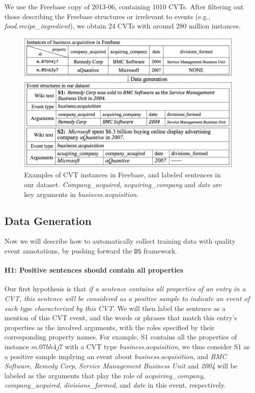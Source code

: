 We use the Freebase copy of 2013-06,  %
containing 1010 CVTs. After filtering out those %
describing the Freebase structures  or irrelevant to events (e.g., \emph{food.recipe\_ingredient}), we obtain 24 CVTs with around 280 million instances.    
%
\begin{figure}[h]
	\centering
	\includegraphics[width=.45\textwidth]{temp}
	\caption{Examples of CVT instances in Freebase, and labeled sentences in our dataset. \emph{Company\_acquired}, \emph{acquiring\_company} and \emph{date} are key arguments in \emph{business.acquisition}. \label{fig:3}}
\end{figure}

\subsection{Data Generation\label{datagen}}
Now we will describe how to automatically collect training data with quality event annotations, by pushing forward the \texttt{DS} framework.

\paragraph{H1: Positive sentences should contain all properties}
Our first hypothesis is that \textit{if a sentence contains all properties of an entry in a CVT, this sentence will be 
considered as a positive sample to indicate an event of such type characterized by this CVT}. 
We will then label the sentence as a mention of this CVT event, and the words or phrases that 
match this entry's properties as the involved arguments, with the roles specified by their 
corresponding property names. 
For example, S1 contains all the properties of instance $m.07bh4j7$ with a CVT type \emph{business.acquisition}, 
we thus consider S1 as a positive sample implying an event about \emph{business.acquisition}, and \emph{BMC Software}, \emph{Remedy Corp}, \emph{Service Management Business Unit} and \emph{2004} will be labeled as the arguments that play the role of \emph{acquiring\_company}, \emph{company\_acquired}, \emph{divisions\_formed}, and \emph{date} in this event, respectively.

